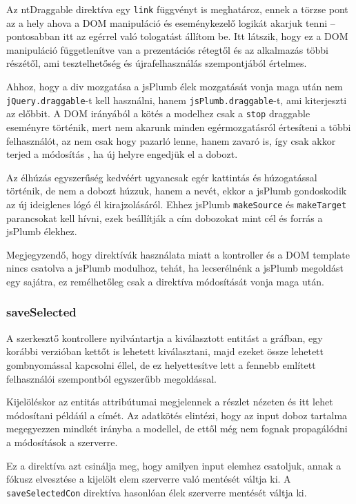 Az ntDraggable direktíva egy \lstinline{link} függvényt is meghatároz, ennek a törzse pont az a hely ahova a DOM manipuláció és eseménykezelő logikát akarjuk tenni -- pontosabban itt az egérrel való tologatást állítom be. Itt látszik, hogy ez a DOM manipuláció függetlenítve van a prezentációs rétegtől és az alkalmazás többi részétől, ami tesztelhetőség és újrafelhasználás szempontjából értelmes. 

Ahhoz, hogy a div mozgatása a jsPlumb élek mozgatását vonja maga után nem \lstinline{jQuery.draggable}-t kell használni, hanem \lstinline{jsPlumb.draggable}-t, ami kiterjeszti az előbbit. A DOM irányából a kötés a modelhez csak a \lstinline{stop} draggable eseményre történik, mert nem akarunk minden egérmozgatásról értesíteni a többi felhasználót, az nem csak hogy pazarló lenne, hanem zavaró is, így csak akkor terjed a módosítás , ha új helyre engedjük el a dobozt.

Az élhúzás egyszerűség kedvéért ugyancsak egér kattintás és húzogatással történik, de nem a dobozt húzzuk, hanem a nevét, ekkor a jsPlumb gondoskodik az új ideiglenes lógó él kirajzolásáról. Ehhez jsPlumb \lstinline{makeSource} és \lstinline{makeTarget} parancsokat kell hívni, ezek beállítják a cím dobozokat mint cél és forrás a jsPlumb élekhez.

Megjegyzendő, hogy direktívák használata miatt a kontroller és a DOM template nincs csatolva a jsPlumb modulhoz, tehát, ha lecserélnénk a jsPlumb megoldást egy sajátra, ez remélhetőleg csak a direktíva módosítását vonja maga után.

\subsubsection{saveSelected}

A szerkesztő kontrollere nyilvántartja a kiválasztott entitást a gráfban, egy korábbi verzióban kettőt is lehetett kiválasztani, majd ezeket össze lehetett gombnyomással kapcsolni éllel, de ez helyettesítve lett a fennebb említett felhasználói szempontból egyszerűbb megoldással. 

Kijelöléskor  
az entitás attribútumai megjelennek a részlet nézeten és itt lehet módosítani példáúl a címét. Az adatkötés elintézi, hogy az input doboz tartalma megegyezzen mindkét irányba a modellel, de ettől még nem fognak propagálódni a módosítások a szerverre. 

Ez a direktíva azt csinálja meg, hogy amilyen input elemhez csatoljuk, annak a fókusz elvesztése a kijelölt elem szerverre való mentését váltja ki. A \lstinline{saveSelectedCon} direktíva hasonlóan élek szerverre mentését váltja ki.


